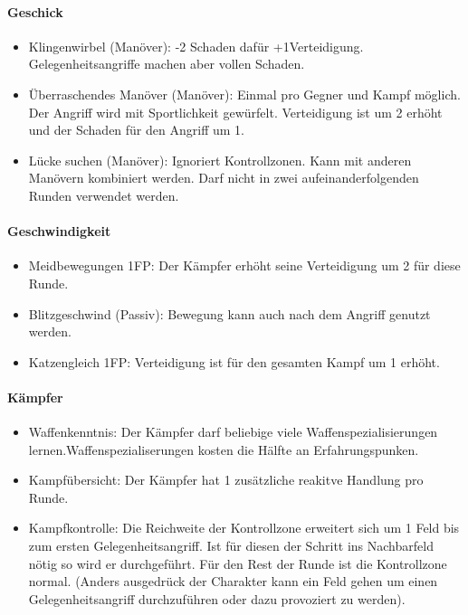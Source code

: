 \documentclass{article}
\begin{document}
\paragraph{Geschick}

\begin{itemize}
\item Klingenwirbel (Manöver): -2 Schaden dafür +1Verteidigung. Gelegenheitsangriffe machen aber vollen Schaden.
\item Überraschendes Manöver (Manöver): Einmal pro Gegner und Kampf möglich. Der Angriff wird mit Sportlichkeit gewürfelt. Verteidigung ist um 2 erhöht und der Schaden für den Angriff um 1.
\item Lücke suchen (Manöver): Ignoriert Kontrollzonen. Kann mit anderen Manövern kombiniert werden. Darf nicht in zwei aufeinanderfolgenden Runden verwendet werden.
\end{itemize}

\paragraph{Geschwindigkeit}

\begin{itemize}
\item Meidbewegungen 1FP: Der Kämpfer erhöht seine Verteidigung um 2 für diese Runde.
\item Blitzgeschwind (Passiv): Bewegung kann auch nach dem Angriff genutzt werden.
\item Katzengleich 1FP: Verteidigung ist für den gesamten Kampf um 1 erhöht.
\end{itemize}

\paragraph{Kämpfer}

\begin{itemize}
\item Waffenkenntnis: Der Kämpfer darf beliebige viele Waffenspezialisierungen lernen.Waffenspezialiserungen kosten die Hälfte an Erfahrungspunken.
\item Kampfübersicht: Der Kämpfer hat 1 zusätzliche reakitve Handlung pro Runde.
\item Kampfkontrolle: Die Reichweite der Kontrollzone erweitert sich um 1 Feld bis zum ersten Gelegenheitsangriff. Ist für diesen der Schritt ins Nachbarfeld nötig so wird er durchgeführt. Für den Rest der Runde ist die Kontrollzone normal. (Anders ausgedrück der Charakter kann ein Feld gehen um einen Gelegenheitsangriff durchzuführen oder dazu provoziert zu werden).
\end{itemize}
\end{document}
